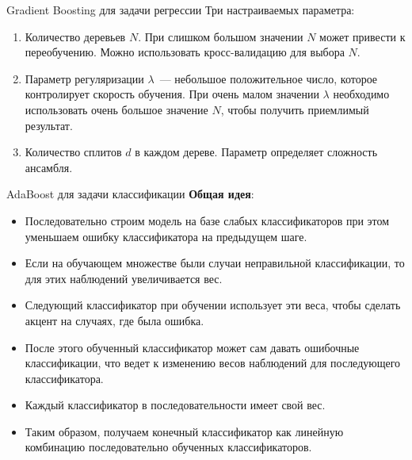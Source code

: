\documentclass[notheorems, handout]{beamer}
\begin{document}
\begin{frame}{Gradient Boosting для задачи регрессии}
Три настраиваемых параметра:
\begin{enumerate}
	\item Количество деревьев $N$. При слишком большом значении $N$ может привести к переобучению. Можно использовать кросс-валидацию для выбора $N$.
	\item Параметр регуляризации $\lambda$~--- небольшое положительное число, которое контролирует скорость обучения. При очень малом значении $\lambda$ необходимо использовать очень большое значение $N$, чтобы получить приемлимый результат.
	\item Количество сплитов $d$ в каждом дереве. Параметр определяет сложность ансамбля.
\end{enumerate}
\end{frame}

\begin{frame}{AdaBoost для задачи классификации}
\textbf{Общая идея}:
\begin{itemize}
	\item Последовательно строим модель на базе слабых классификаторов при этом уменьшаем ошибку классификатора на предыдущем шаге.
	\item Если на обучающем множестве были случаи неправильной классификации, то для этих наблюдений увеличивается вес.
	\item Следующий классификатор при обучении использует эти веса, чтобы сделать акцент на случаях, где была ошибка.
	\item После этого обученный классификатор может сам давать ошибочные классификации, что ведет к изменению весов наблюдений для последующего классификатора.
	\item Каждый классификатор в последовательности имеет свой вес.
	\item Таким образом, получаем конечный классификатор как линейную комбинацию последовательно обученных классификаторов.
\end{itemize} 
\end{frame}
\end{document}
